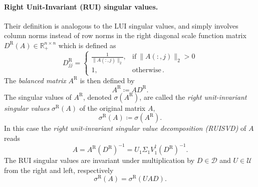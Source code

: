 \documentclass[11pt,a4paper]{article}
\begin{document}
\paragraph{Right Unit-Invariant (RUI) singular values.} Their definition is analogous to the LUI singular values, and simply involves column norms instead of row norms in the right diagonal scale function matrix \( D^\mathrm{R}(A) \in \mathbb{R}^{n\times n}_+\) which is defined as
\begin{equation}\label{eq:RDSF}
D^\mathrm{R}_{jj} =
\begin{cases}
\frac{1}{\|A(:, j)\|_2}, & \text{if} \ \|A(:, j)\|_2 > 0 \\
1, & \text{otherwise}\,.
\end{cases}
\end{equation}
The \emph{balanced matrix} \( A^\mathrm{R} \) is then defined by
\begin{equation}
A^\mathrm{R} \coloneq AD^\mathrm{R}.\label{balancedAR}
\end{equation}
The singular values of \( A^\mathrm{R} \), denoted \( \sigma(A^\mathrm{R}) \), are called the \textit{right unit-invariant singular values} \( \sigma^\mathrm{R}(A) \) of the original matrix $A$,
\begin{equation}
\sigma^\mathrm{R}(A) \coloneq \sigma(A^\mathrm{R}).\label{RSVA}
\end{equation}
In this case the \textit{right unit-invariant singular value decomposition (RUISVD)} of $A$ reads
\begin{equation}
A = A^\mathrm{R}(D^\mathrm{R})^{-1} = U_1 \Sigma_1 V^\dagger_1 (D^\mathrm{R})^{-1}.
\end{equation} 
The RUI singular values are invariant under multiplication by \( D \in \mathcal{D} \) and \( U \in \mathcal{U} \) from the right and left, respectively
\begin{equation}
\sigma^\mathrm{R}(A) = \sigma^\mathrm{R}(UAD).
\end{equation}
\end{document}
